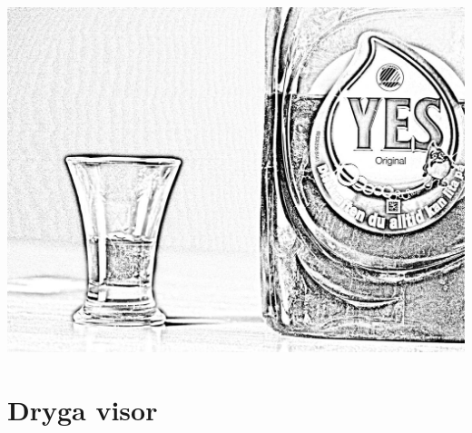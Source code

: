 \documentclass{article}
\begin{document}
\newpage
\thispagestyle{empty}
\null
\vfill
\begin{center}

   \includegraphics[width=1.0\textwidth]{res/drygavisor.jpg}
   \section{Dryga visor}
\end{center}
\vfill
\newpage
\end{document}
